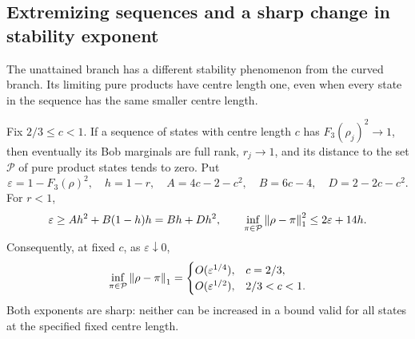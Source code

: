 \subsection{Extremizing sequences and a sharp change in stability exponent}
The unattained branch has a different stability phenomenon from the curved
branch. Its limiting pure products have centre length one, even when every
state in the sequence has the same smaller centre length.

\begin{theorem}\label{thm:flatstability}
Fix $2/3\leq c<1$. If a sequence of states with centre length $c$ has
$F_3(\rho_j)^2\to1$, then eventually its Bob marginals are full rank,
$r_j\to1$, and its distance to the set $\mathcal P$ of pure product states
tends to zero. Put
\[
\varepsilon=1-F_3(\rho)^2,\quad h=1-r,\quad
A=4c-2-c^2,\quad B=6c-4,\quad D=2-2c-c^2.
\]
For $r<1$,
\begin{equation}\label{eq:flatrate}
\varepsilon\geq Ah^2+B(1-h)h=Bh+Dh^2,\qquad
\inf_{\pi\in\mathcal P}\left\lVert\rho-\pi\right\rVert_1^2\leq2\varepsilon+14h.
\end{equation}
Consequently, at fixed $c$, as $\varepsilon\downarrow0$,
\begin{equation}\label{eq:criticalrate}
\inf_{\pi\in\mathcal P}\left\lVert\rho-\pi\right\rVert_1=
\begin{cases}
O(\varepsilon^{1/4}),&c=2/3,\\
O(\varepsilon^{1/2}),&2/3<c<1.
\end{cases}
\end{equation}
Both exponents are sharp: neither can be increased in a bound valid for all
states at the specified fixed centre length.
\end{theorem}
